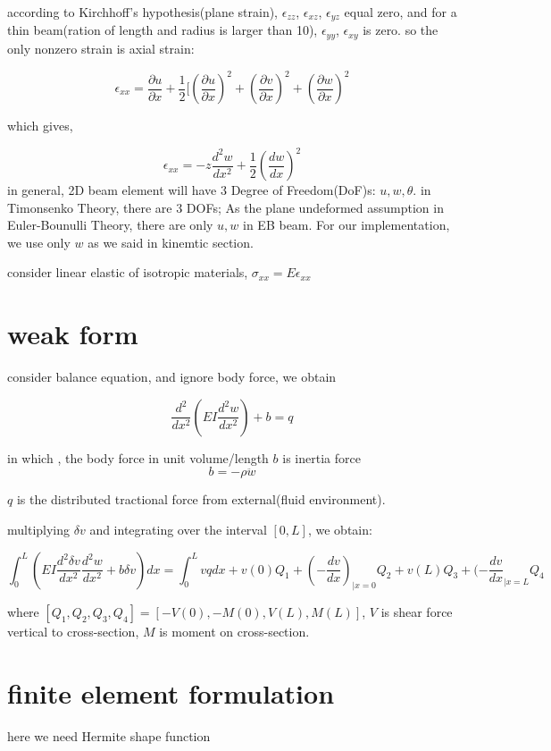 \documentclass[11pt]{article}
\begin{document}
according to Kirchhoff's hypothesis(plane strain), $\epsilon_{zz}$, $\epsilon_{xz}$, $\epsilon_{yz}$ equal zero, and for a thin beam(ration of length and radius is larger than 10), $\epsilon_{yy}$, $\epsilon_{xy}$ is zero. so the only nonzero strain is axial strain:

$$ \epsilon_{xx} = \frac{\partial u}{\partial x} + \frac{1}{2}[(\frac{\partial u}{\partial x})^2 + (\frac{\partial v}{\partial x})^2 + (\frac{\partial w}{\partial x})^2 $$

which gives,

$$ \epsilon_{xx} = -z \frac{d^2 w}{dx^2} + \frac{1}{2} (\frac{dw}{dx})^2 $$
in general, 2D beam element will have 3 Degree of Freedom(DoF)s: $u, w, \theta$. in Timonsenko Theory, there are 3 DOFs; As the plane undeformed assumption in Euler-Bounulli Theory, there are only $u, w$ in EB beam. For our implementation, we use only $w$ as we said in kinemtic section.

consider linear elastic of isotropic materials, $\sigma_{xx} = E \epsilon_{xx}$

\section{weak form}

 consider balance equation, and ignore body force, we obtain

 $$ \frac{d^2}{dx^2}(EI \frac{d^2w}{dx^2}) + b = q $$

in which , the body force in unit volume/length  $b$ is  inertia force 
$$ b = - \rho \ddot{w} $$

$q$ is the distributed tractional force from external(fluid environment).

multiplying $\delta v$ and integrating over the interval $[0,L]$, we obtain:

$$ \int_0^L (EI \frac{d^2 \delta v}{dx^2} \frac{d^2w}{dx^2} + b \delta v)dx = \int_0^L v q dx + v(0) Q_1 + (-\frac{dv}{dx})_{|x=0} Q_2 + v(L) Q_3 + (-\frac{dv}{dx}_{|x=L} Q_4 $$

where $[Q_1, Q_2, Q_3, Q_4] = [-V(0), -M(0), V(L), M(L)] $, $V$ is shear force vertical to cross-section, $M$ is moment on cross-section.

\section{finite element formulation}

here we need Hermite shape function
\end{document}
